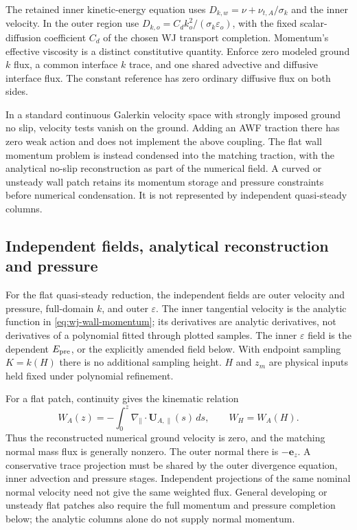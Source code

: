 \documentclass[11pt,a4paper]{article}
\numberwithin{equation}{section}
\newcommand{\eps}{\varepsilon}
\begin{document}
The retained inner kinetic-energy equation uses
$D_{k,w}=\nu+\nu_{t,A}/\sigma_k$ and the inner velocity. In the outer
region use $D_{k,o}=C_d k_o^2/(\sigma_k\varepsilon_o)$, with the
fixed scalar-diffusion coefficient $C_d$ of the chosen WJ transport
completion. Momentum's effective viscosity is a distinct constitutive
quantity. Enforce zero modeled ground $k$ flux, a common interface
$k$ trace, and one shared advective and diffusive interface flux.
The constant reference has zero ordinary diffusive flux on both sides.

In a standard continuous Galerkin velocity space with strongly imposed
ground no slip, velocity tests vanish on the ground. Adding an AWF
traction there has zero weak action and does not implement the above
coupling. The flat wall momentum problem is instead condensed into
the matching traction, with the analytical no-slip reconstruction as
part of the numerical field. A curved or unsteady wall patch retains
its momentum storage and pressure constraints before numerical
condensation. It is not represented by independent quasi-steady columns.


\subsection{Independent fields, analytical reconstruction and pressure}
\label{sec:hp-independent}
For the flat quasi-steady reduction, the independent fields are outer velocity and
pressure, full-domain $k$, and outer $\eps$. The inner tangential
velocity is the analytic function in \cref{eq:wj-wall-momentum};
its derivatives are analytic derivatives, not derivatives of a
polynomial fitted through plotted samples. The inner $\eps$ field is
the dependent $E_{\rm pre}$, or the explicitly amended field below.
With endpoint sampling $K=k(H)$ there is no additional sampling height.
$H$ and $z_m$ are physical inputs held fixed under polynomial refinement.

For a flat patch, continuity gives the kinematic relation
\begin{equation}
 W_A(z)=-\int_0^z\nabla_\parallel\cdot\bm U_{A,\parallel}(s)\,ds,
 \qquad W_H=W_A(H).
 \label{eq:flat-transpiration}
\end{equation}
Thus the reconstructed numerical ground velocity is zero, and the
matching normal mass flux is generally nonzero. The outer normal there
is $-\bm e_z$. A conservative trace projection must be shared by the
outer divergence equation, inner advection and pressure stages.
Independent projections of the same nominal normal velocity need not
give the same weighted flux. General developing or unsteady flat
patches also require the full momentum and pressure completion below;
the analytic columns alone do not supply normal momentum.
\end{document}

